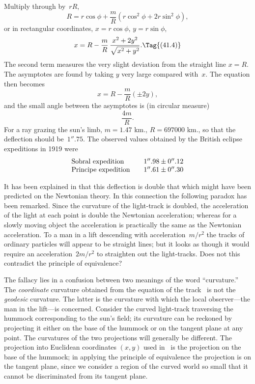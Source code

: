 \documentclass[12pt]{book}
\begin{document}
Multiply through by~$rR$,
\[
R = r\cos\phi + \frac{m}{R} (r\cos^{2}\phi + 2r\sin^{2}\phi),
\]
or in rectangular coordinates, $x = r\cos\phi$, $y = r\sin\phi$,
\[
x = R - \frac{m}{R}\, \frac{x^{2} + 2y^{2}}{\sqrt{x^{2} + y^{2}}}.
\Tag{(41.4)}
\]
The second term measures the very slight deviation from the straight line
$x = R$. The asymptotes are found by taking $y$ very large compared with~$x$.
The equation then becomes
\[
x = R - \frac{m}{R}(\pm2y),
\]
and the small angle between the asymptotes is (in circular measure)
\[
\frac{4m}{R}.
\]
For a ray grazing the sun's limb, $m = 1.47$ km., $R = 697000$ km., so that the
%
deflection should be~$1''.75$. The observed values obtained by the British
eclipse expeditions in 1919 were
\[
\begin{array}{l@{\qquad}c}
\text{Sobral expedition} & 1''.98 \pm 0''.12 \\
\text{Principe expedition} & 1''.61 \pm 0''.30 \\
\end{array}
\]

It has been explained in  that this deflection
is double that which might have been predicted on the Newtonian theory.
In this connection the following paradox has been remarked. Since the curvature
of the light-track is doubled, the acceleration of the light at each point
is double the Newtonian acceleration; whereas for a slowly moving object the
acceleration is practically the same as the Newtonian acceleration. To a man
in a lift descending with acceleration~$m/r^{2}$ the tracks of ordinary particles will
appear to be straight lines; but it looks as though it would require an acceleration~$2m/r^{2}$
to straighten out the light-tracks. Does not this contradict the
principle of equivalence?

The fallacy lies in a confusion between two meanings of the word ``curvature.''
%
%
%
The \emph{coordinate} curvature obtained from the equation of the track~
is not the \emph{geodesic} curvature. The latter is the curvature with which the local
observer---the man in the lift---is concerned. Consider the curved light-track
traversing the hummock corresponding to the sun's field; its curvature can be
reckoned by projecting it either on the base of the hummock or on the tangent
plane at any point. The curvatures of the two projections will generally be
different. The projection into Euclidean coordinates $(x, y)$ used in~ is the
projection on the base of the hummock; in applying the principle of equivalence
the projection is on the tangent plane, since we consider a region of the
curved world so small that it cannot be discriminated from its tangent plane.
\end{document}
